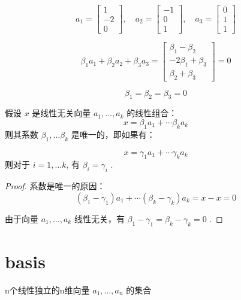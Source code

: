 \begin{example}
    $$ a_{1}=\left[\begin{array}{c}1 \\ -2 \\ 0\end{array}\right], \quad a_{2}=\left[\begin{array}{c}-1 \\ 0 \\ 1\end{array}\right], \quad a_{3}=\left[\begin{array}{l}0 \\ 1 \\ 1\end{array}\right] $$

    $$ \beta_{1} a_{1}+\beta_{2} a_{2}+\beta_{3} a_{3}=\left[\begin{array}{c}\beta_{1}-\beta_{2} \\ -2 \beta_{1}+\beta_{3} \\ \beta_{2}+\beta_{3}\end{array}\right]=0 $$

    $$ \beta_{1}=\beta_{2}=\beta_{3}=0 $$
\end{example}

\begin{theorem}
    假设 $ x $ 是线性无关向量 $ a_{1}, \ldots, a_{k} $ 的线性组合：
$$
x=\beta_{1} a_{1}+\cdots \beta_{k} a_{k}
$$
则其系数 $ \beta_{1}, \ldots \beta_{k} $ 是唯一的，即如果有：

$$
x=\gamma_{1} a_{1}+\cdots \gamma_{k} a_{k}
$$
则对于 $ i=1, \ldots k $, 有 $ \beta_{i}=\gamma_{i} $ . 
\end{theorem}

\begin{proof}
    系数是唯一的原因：
$$
\left(\beta_{1}-\gamma_{1}\right) a_{1}+\cdots\left(\beta_{k}-\gamma_{k}\right) a_{k}=x-x=0
$$

由于向量 $ a_{1}, \ldots, a_{k} $ 线性无关，有 $ \beta_{1}-\gamma_{1}=\beta_{k}-\gamma_{k}=0 $ . 
\end{proof}

\section{basis}

\begin{definition}[基 (basis)]
    n个线性独立的n维向量 $ a_{1}, \ldots, a_{n} $ 的集合
\end{definition}

